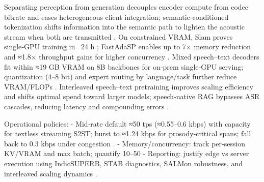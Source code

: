 \documentclass{article}
\begin{document}
Separating perception from generation decouples encoder compute from codec bitrate and eases heterogeneous client integration; semantic‑conditioned tokenization shifts information into the semantic path to lighten the acoustic stream when both are transmitted \cite{hu2025salmduplexefficientdirectmodelingspeechl,yang2025diffsoundstreamefficientspeechtokenizati}. On constrained VRAM, Slam proves single‑GPU training in ~24 h \cite{maimon2025slammingtrainingspeechlanguagemodelonegp}; FastAdaSP enables up to 7× memory reduction and ≈1.8× throughput gains for higher concurrency \cite{lu2024fastadaspmultitaskadaptedefficientinfere}. Mixed speech–text decoders fit within ≈19 GB VRAM on 8B backbones for on‑prem single‑GPU serving; quantization (4–8 bit) and expert routing by language/task further reduce VRAM/FLOPs \cite{dao2025ichigomixedmodalearlyfusionrealtimevoice,lu2024fastadaspmultitaskadaptedefficientinfere}. Interleaved speech–text pretraining improves scaling efficiency and shifts optimal spend toward larger models; speech‑native RAG bypasses ASR cascades, reducing latency and compounding errors \cite{maimon2025scalinganalysisinterleavedspeechtextlang,min2025speechretrievalaugmentedgenerationwithou,wang2023slmbridgethingapbetweenspeechtextfoundat,maimon2025slammingtrainingspeechlanguagemodelonegp}.

Operational policies:
- Mid‑rate default ≈50 tps (≈0.55–0.6 kbps) with capacity for textless streaming S2ST; burst to ≈1.24 kbps for prosody‑critical spans; fall back to 0.3 kbps under congestion \cite{zhao2024textlessstreamingspeechtranslationsemant,yang2025diffsoundstreamefficientspeechtokenizati,xue2025hhcodechighcompressionfidelitydiscretene}.
- Memory/concurrency: track per‑session KV/VRAM and max batch; quantify 10–50%
- Reporting: justify edge vs server execution using IndicSUPERB, STAB diagnostics, SALMon robustness, and interleaved scaling dynamics \cite{entry2025indicsuperbspeechprocessinguniversalperf,vashishth2024stabspeechtokenizerassessmentbenchmark,maimon2025salmonsuiteacousticlanguagemodelevaluati,maimon2025scalinganalysisinterleavedspeechtextlang}.
\end{document}
